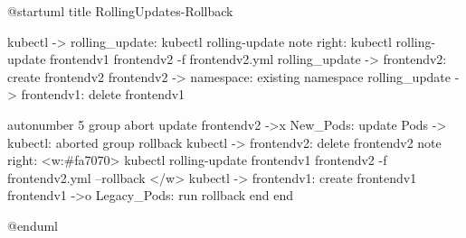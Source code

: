 @startuml
title RollingUpdates-Rollback

kubectl -> rolling_update: kubectl rolling-update
note right: kubectl rolling-update frontendv1 frontendv2 -f frontendv2.yml
rolling_update -> frontendv2: create frontendv2
frontendv2 -> namespace: existing namespace
rolling_update -> frontendv1: delete frontendv1

autonumber 5
group abort update
  frontendv2 ->x New_Pods: update
  Pods -> kubectl: aborted
  group rollback
    kubectl -> frontendv2: delete frontendv2
    note right: <w:#fa7070> kubectl rolling-update frontendv1 frontendv2 -f frontendv2.yml --rollback </w>
    kubectl -> frontendv1: create frontendv1
    frontendv1 ->o Legacy_Pods: run rollback
    end
end

@enduml
